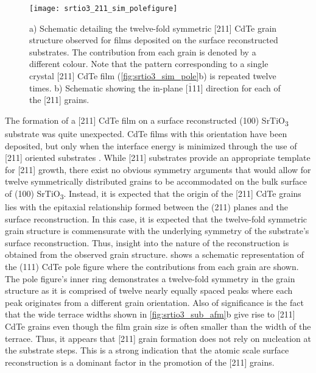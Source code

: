 \begin{figure}
    \centering
    \texttt{[image: srtio3\_211\_sim\_polefigure]}
    \caption[Simulated pole figure of CdTe on reconstructed SrTiO\textsubscript{3}]{\label{fig:srtio3_211_sim_polefigure}a) Schematic detailing the twelve-fold symmetric [211] CdTe grain structure observed for films deposited on the surface reconstructed substrates. The contribution
        from each grain is denoted by a different colour. Note that the pattern corresponding to a single crystal [211] CdTe film (\cref{fig:srtio3_sim_pole}b) is repeated twelve times. b) Schematic showing the in-plane [$\overline{1}$11] direction for each of the [211] grains.}
\end{figure}

The formation of a [211] CdTe film on a surface reconstructed
(100) SrTiO\textsubscript{3} substrate was quite unexpected. CdTe films with this
orientation have been deposited, but only when the interface
energy is minimized through the use of [211] oriented substrates
\cite{Lange1991b,Million1996,Rujirawat1997a,Zanatta1998}. While [211] substrates provide an appropriate template
for [211] growth, there exist no obvious symmetry arguments
that would allow for twelve symmetrically distributed grains to be
accommodated on the bulk surface of (100) SrTiO\textsubscript{3}. Instead, it is
expected that the origin of the [211] CdTe grains lies with the
epitaxial relationship formed between the (211) planes and the
surface reconstruction. In this case, it is expected that the twelve-fold symmetric grain structure is commensurate with the underlying symmetry of the substrate’s surface reconstruction. Thus,
insight into the nature of the reconstruction is obtained from the
observed grain structure.  shows a schematic representation
of the (111) CdTe pole figure where the contributions from each
grain are shown. The pole figure’s inner ring demonstrates a
twelve-fold symmetry in the grain structure as it is comprised of twelve nearly equally spaced peaks where each peak originates
from a different grain orientation. Also of significance is the fact
that the wide terrace widths shown in \cref{fig:srtio3_sub_afm}b give rise to [211]
CdTe grains even though the film grain size is often smaller than
the width of the terrace. Thus, it appears that [211] grain
formation does not rely on nucleation at the substrate steps. This is
a strong indication that the atomic scale surface reconstruction is a
dominant factor in the promotion of the [211] grains.


